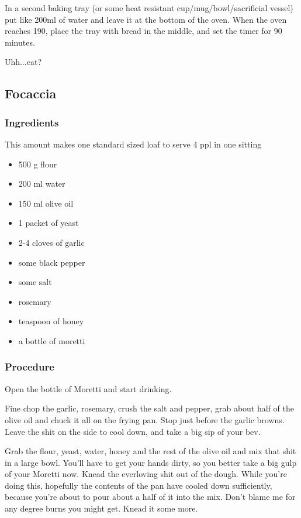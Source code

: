 \documentclass[10pt]{article}
\begin{document}
In a second baking tray (or some heat resistant cup/mug/bowl/sacrificial vessel) put like 200ml of water and leave it at the bottom of the oven. When the oven reaches 190, place the tray with bread in the middle, and set the timer for 90 minutes.\par

Uhh...eat?
\subsection{Focaccia}%
\label{sub:focaccia}

\subsubsection{Ingredients}%
\label{ssub:focaccia_ingredients}
This amount makes one standard sized loaf to serve 4 ppl in one sitting

\begin{itemize}
	\item 500 g flour
	\item 200 ml water
	\item 150 ml olive oil
	\item 1 packet of yeast
	\item 2-4 cloves of garlic
	\item some black pepper
	\item some salt
	\item rosemary
	\item teaspoon of honey
	\item a bottle of moretti
\end{itemize}
\subsubsection{Procedure}%
\label{ssub:focaccia_procedure}

Open the bottle of Moretti and start drinking.\par

Fine chop the garlic, rosemary, crush the salt and pepper, grab about half of the olive oil and chuck it all on the frying pan. Stop just before the garlic browns. Leave the shit on the side to cool down, and take  a big sip of your bev. \par

Grab the flour, yeast, water, honey and the rest of the olive oil and mix that shit in a large bowl. You'll have to get your hands dirty, so you better take a big gulp of your Moretti now. Knead the everloving shit out of the dough. While you're doing this, hopefully the contents of the pan have cooled down sufficiently, because you're about to pour about a half of it into the mix. Don't blame me for any degree burns you might get. Knead it some more. \par
\end{document}
